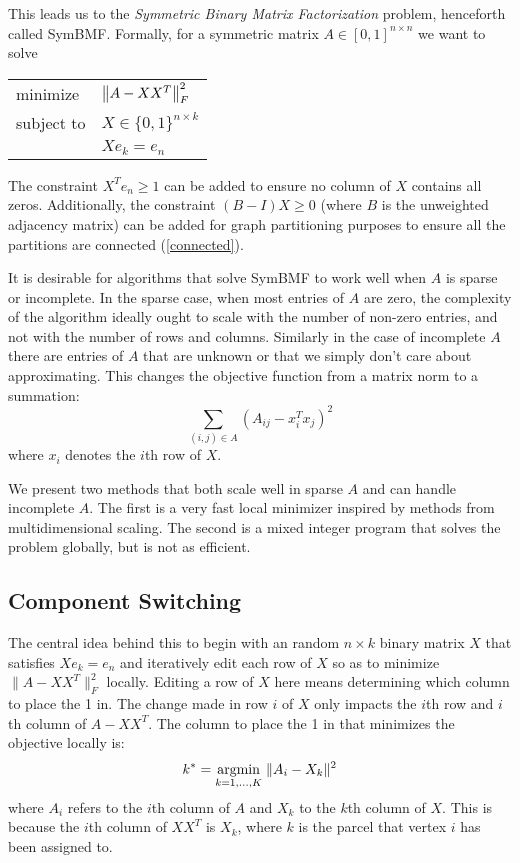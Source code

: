 This leads us to the \textit{Symmetric Binary Matrix Factorization}
problem, henceforth called SymBMF. Formally, for a symmetric matrix
$A \in [0, 1]^{n \times n}$ we want to solve
\begin{center}
\begin{tabular}{l l}
minimize   & $\left\lVert A - X X^T\right\rVert_F^2$ \\
subject to & $X \in \{0, 1\}^{n \times k}$ \\
           & $X e_k = e_n$
\end{tabular}
\end{center}
The constraint $X^T e_n \geq 1$ can be added to ensure no column of $X$
contains all zeros. Additionally, the constraint $(B - I) X \geq 0$
(where $B$ is the unweighted adjacency matrix) can be added for graph
partitioning purposes to ensure all the partitions are connected
(\ref{connected}).

It is desirable for algorithms that solve SymBMF to work well when $A$
is sparse or incomplete. In the sparse case, when most entries of $A$
are zero, the complexity of the algorithm ideally ought to scale with
the number of non-zero entries, and not with the number of rows and
columns. Similarly in the case of incomplete $A$ there are entries of
$A$ that are unknown or that we simply don't care about approximating.
This changes the objective function from a matrix norm to a summation:
\[ \sum_{(i,j) \in A} (A_{ij} - x_i^T x_j)^2 \]
where $x_i$ denotes the $i$th row of $X$.

We present two methods that both scale well in sparse $A$ and can
handle incomplete $A$. The first is a very fast local minimizer
inspired by methods from multidimensional scaling. The second is a
mixed integer program that solves the problem globally, but is not
as efficient.

\subsection{Component Switching}

The central idea behind this to begin with an random $n \times k$
binary matrix $X$ that satisfies $X e_k = e_n$ and iteratively
edit each row of $X$ so as to minimize $\|A - X X^T\|_F^2$ locally.
Editing a row of $X$ here means determining which column to place the 1
in. The change made in row $i$ of $X$ only impacts the $i$th row and
$i$th column of $A - X X^T$. The column to place the 1 in that minimizes
the objective locally is:
\begin{equation} \label{col_select}
k^* = \underset{k = 1,...,K}{\mathrm{arg min}}\; \|A_i - X_k\|^2
\end{equation}
where $A_i$ refers to the $i$th column of $A$ and $X_k$ to the $k$th
column of $X$. This is because the $i$th column of $X X^T$ is $X_k$,
where $k$ is the parcel that vertex $i$ has been assigned to.

